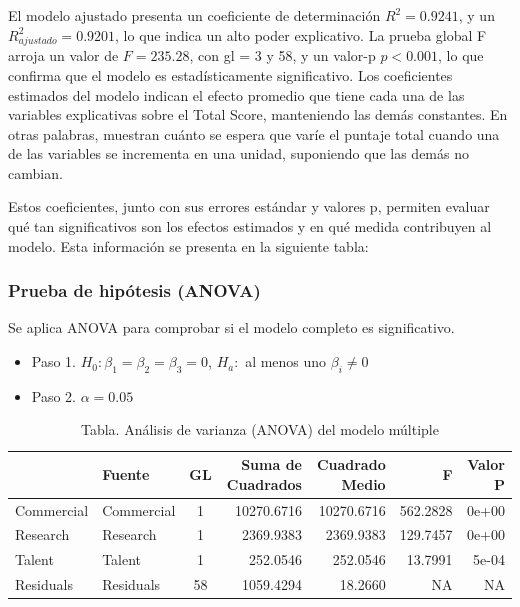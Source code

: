 \documentclass[
]{article}
\begin{document}
\begin{multicols}{2}
El modelo ajustado presenta un coeficiente de determinación \( R^2 = 0.9241\), y un \( R^2_{ajustado} = 0.9201\), lo que indica un alto poder explicativo. La prueba global F arroja un valor de \( F = 235.28\), con gl = 3 y 58, y un valor-p \( p < 0.001 \), lo que confirma que el modelo es estadísticamente significativo.
Los coeficientes estimados del modelo indican el efecto promedio que tiene cada una de las variables explicativas sobre el Total Score, manteniendo las demás constantes. En otras palabras, muestran cuánto se espera que varíe el puntaje total cuando una de las variables se incrementa en una unidad, suponiendo que las demás no cambian.

Estos coeficientes, junto con sus errores estándar y valores p, permiten evaluar qué tan significativos son los efectos estimados y en qué medida contribuyen al modelo. Esta información se presenta en la siguiente tabla:


\subsubsection{Prueba de hipótesis (ANOVA)}

Se aplica ANOVA para comprobar si el modelo completo es significativo.

\begin{itemize}
  \item Paso 1. \( H_0: \beta_1 = \beta_2 = \beta_3 = 0 \), \quad \( H_a: \) al menos uno \( \beta_i \neq 0 \)
  \item Paso 2. \( \alpha = 0.05 \)
\end{itemize}

\end{multicols}

\renewcommand{\arraystretch}{1.3}
\begin{footnotesize}
\begin{longtable}[t]{llcrrrr}
\caption{\label{tab:modelo_multip_anova}Tabla. Análisis de varianza (ANOVA) del modelo múltiple}\\
\toprule
  & Fuente & GL & Suma de Cuadrados & Cuadrado Medio & F & Valor P\\
\midrule
Commercial & Commercial & 1 & 10270.6716 & 10270.6716 & 562.2828 & 0e+00\\
Research & Research & 1 & 2369.9383 & 2369.9383 & 129.7457 & 0e+00\\
Talent & Talent & 1 & 252.0546 & 252.0546 & 13.7991 & 5e-04\\
Residuals & Residuals & 58 & 1059.4294 & 18.2660 & NA & NA\\
\bottomrule
\end{longtable}

\end{footnotesize}\renewcommand{\arraystretch}{1}
\end{document}
